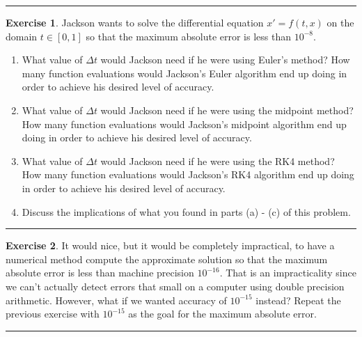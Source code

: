 \documentclass[
]{book}
\providecommand{\tightlist}{%
  \setlength{\itemsep}{0pt}\setlength{\parskip}{0pt}}
\theoremstyle{definition}
\theoremstyle{definition}
\theoremstyle{definition}
\newtheorem{exercise}{Exercise}[chapter]
\theoremstyle{remark}
\begin{document}
\begin{center}\rule{0.5\linewidth}{0.5pt}\end{center}

\begin{exercise}
\protect\hypertarget{exr:unnamed-chunk-457}{}{\label{exr:unnamed-chunk-457} }Jackson wants to solve the differential equation \(x' = f(t,x)\) on the domain \(t \in [0,1]\) so that the maximum absolute error is less than \(10^{-8}\).

\begin{enumerate}
\def\labelenumi{\alph{enumi}.}
\tightlist
\item
  What value of \(\Delta t\) would Jackson need if he were using Euler's method? How many function evaluations would Jackson's Euler algorithm end up doing in order to achieve his desired level of accuracy.
\item
  What value of \(\Delta t\) would Jackson need if he were using the midpoint method? How many function evaluations would Jackson's midpoint algorithm end up doing in order to achieve his desired level of accuracy.
\item
  What value of \(\Delta t\) would Jackson need if he were using the RK4 method? How many function evaluations would Jackson's RK4 algorithm end up doing in order to achieve his desired level of accuracy.
\item
  Discuss the implications of what you found in parts (a) - (c) of this problem.
\end{enumerate}
\end{exercise}

\begin{center}\rule{0.5\linewidth}{0.5pt}\end{center}

\begin{exercise}
\protect\hypertarget{exr:unnamed-chunk-458}{}{\label{exr:unnamed-chunk-458} }It would nice, but it would be completely impractical, to have a numerical method compute the approximate solution so that the maximum absolute error is less than machine precision \(10^{-16}\). That is an impracticality since we can't actually detect errors that small on a computer using double precision arithmetic. However, what if we wanted accuracy of \(10^{-15}\) instead? Repeat the previous exercise with \(10^{-15}\) as the goal for the maximum absolute error.
\end{exercise}

\begin{center}\rule{0.5\linewidth}{0.5pt}\end{center}
\end{document}

